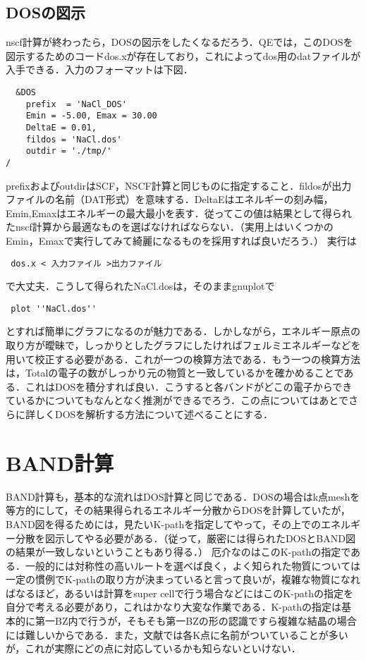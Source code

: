 \documentclass[a4j]{jarticle}
\begin{document}
 \subsection{DOSの図示}
 nscf計算が終わったら，DOSの図示をしたくなるだろう．QEでは，このDOSを図示するためのコードdos.xが存在しており，これによってdos用のdatファイルが入手できる．入力のフォーマットは下図．
\begin{lstlisting}
  &DOS
    prefix  = 'NaCl_DOS'
    Emin = -5.00, Emax = 30.00
    DeltaE = 0.01,
    fildos = 'NaCl.dos'
    outdir = './tmp/'
/
\end{lstlisting}
prefixおよびoutdirはSCF，NSCF計算と同じものに指定すること．fildosが出力ファイルの名前（DAT形式）を意味する．DeltaEはエネルギーの刻み幅，Emin,Emaxはエネルギーの最大最小を表す．従ってこの値は結果として得られたnscf計算から最適なものを選ばなければならない．（実用上はいくつかのEmin，Emaxで実行してみて綺麗になるものを採用すれば良いだろう．）
実行は
\begin{lstlisting}
 dos.x < 入力ファイル >出力ファイル
\end{lstlisting}
で大丈夫．こうして得られたNaCl.dosは，そのままgnuplotで
\begin{lstlisting}
 plot ''NaCl.dos''
\end{lstlisting}
とすれば簡単にグラフになるのが魅力である．しかしながら，エネルギー原点の取り方が曖昧で，しっかりとしたグラフにしたければフェルミエネルギーなどを用いて校正する必要がある．これが一つの検算方法である．もう一つの検算方法は，Totalの電子の数がしっかり元の物質と一致しているかを確かめることである．これはDOSを積分すれば良い．こうすると各バンドがどこの電子からできているかについてもなんとなく推測ができるでろう．この点についてはあとでさらに詳しくDOSを解析する方法について述べることにする．


 \section{BAND計算}
 BAND計算も，基本的な流れはDOS計算と同じである．DOSの場合はk点meshを等方的にして，その結果得られるエネルギー分散からDOSを計算していたが，BAND図を得るためには，見たいK-pathを指定してやって，その上でのエネルギー分散を図示してやる必要がある．（従って，厳密には得られたDOSとBAND図の結果が一致しないということもあり得る．）
 厄介なのはこのK-pathの指定である．一般的には対称性の高いルートを選べば良く，よく知られた物質については一定の慣例でK-pathの取り方が決まっていると言って良いが，複雑な物質になればなるほど，あるいは計算をsuper cellで行う場合などにはこのK-pathの指定を自分で考える必要があり，これはかなり大変な作業である．K-pathの指定は基本的に第一BZ内で行うが，そもそも第一BZの形の認識ですら複雑な結晶の場合には難しいからである．また，文献では各K点に名前がついていることが多いが，これが実際にどの点に対応しているかも知らないといけない．
 
\end{document}
